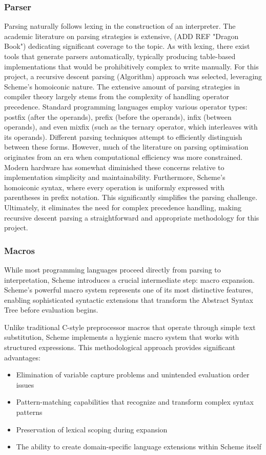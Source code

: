 \documentclass[final]{cmpreport_02}
\begin{document}
\subsubsection{Parser}
Parsing naturally follows lexing in the construction of an interpreter. The academic literature on parsing strategies is extensive, (ADD REF "Dragon Book") dedicating significant coverage to the topic. 
As with lexing, there exist tools that generate parsers automatically, typically producing table-based implementations that would be prohibitively complex to write manually. For this project, a recursive descent parsing (Algorithm) approach was selected, leveraging Scheme's homoiconic nature.
The extensive amount of parsing strategies in compiler theory largely stems from the complexity of handling operator precedence. Standard programming languages employ various operator types: postfix (after the operands), prefix (before the operands), infix (between operands), and even mixfix (such as the ternary operator, which interleaves with its operands). Different parsing techniques attempt to efficiently distinguish between these forms.
However, much of the literature on parsing optimisation originates from an era when computational efficiency was more constrained. Modern hardware has somewhat diminished these concerns relative to implementation simplicity and maintainability.
Furthermore, Scheme's homoiconic syntax, where every operation is uniformly expressed with parentheses in prefix notation. This significantly simplifies the parsing challenge. Ultimately, it eliminates the need for complex precedence handling, making recursive descent parsing a straightforward and appropriate methodology for this project.

\subsubsection{Macros}
While most programming languages proceed directly from parsing to interpretation, Scheme introduces a crucial intermediate step: macro expansion. Scheme's powerful macro system represents one of its most distinctive features, enabling sophisticated syntactic extensions that transform the Abstract Syntax Tree before evaluation begins.

Unlike traditional C-style preprocessor macros that operate through simple text substitution, Scheme implements a hygienic macro system that works with structured expressions. This methodological approach provides significant advantages:

\begin{itemize}
    \item Elimination of variable capture problems and unintended evaluation order issues
    \item Pattern-matching capabilities that recognize and transform complex syntax patterns
    \item Preservation of lexical scoping during expansion
    \item The ability to create domain-specific language extensions within Scheme itself
\end{itemize}
\end{document}

